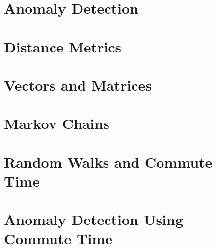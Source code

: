 \section{Anomaly Detection}
\label{anomalyDetection}


\section{Distance Metrics}
\label{distanceMetrics}


\section{Vectors and Matrices}
\label{vectorsAndMatrices}


\section{Markov Chains}
\label{markovChains}


\section{Random Walks and Commute Time}
\label{randomWalks}
\label{commuteTime}


\section{Anomaly Detection Using Commute Time}
\label{anomalyDetection:commuteTime}
